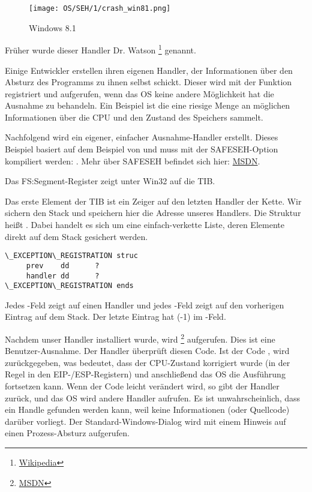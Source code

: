 \begin{figure}[H]
\centering
\texttt{[image: OS/SEH/1/crash\_win81.png]}
\caption{Windows 8.1}
\end{figure}

Früher wurde dieser Handler Dr. Watson
\footnote{\href{http://go.yurichev.com/17046}{Wikipedia}}
genannt.

Einige Entwickler erstellen ihren eigenen Handler, der Informationen über den Absturz
des Programms zu ihnen selbst schickt.
Dieser wird mit der Funktion  registriert und aufgerufen,
wenn das \ac{OS} keine andere Möglichkeit hat die Ausnahme zu behandeln.
\myindex{\oracle}
Ein Beispiel ist \oracle die eine riesige Menge an möglichen Informationen über die \ac{CPU}
und den Zustand des Speichers sammelt.

Nachfolgend wird ein eigener, einfacher Ausnahme-Handler erstellt.
Dieses Beispiel basiert auf dem Beispiel von \PietrekSEH und muss mit der SAFESEH-Option
kompiliert werden: .
Mehr über SAFESEH befindet sich hier: \href{http://go.yurichev.com/17252}{MSDN}.



Das FS:Segment-Register zeigt unter Win32 auf die \ac{TIB}.

Das erste Element der \ac{TIB} ist ein Zeiger auf den letzten Handler der Kette.
Wir sichern den Stack und speichern hier die Adresse unseres Handlers.
Die Struktur heißt . Dabei handelt es sich um eine
einfach-verkette Liste, deren Elemente direkt auf dem Stack gesichert werden.

\begin{lstlisting}[caption=MSVC/VC/crt/src/exsup.inc,style=customasmx86]
\_EXCEPTION\_REGISTRATION struc
     prev    dd      ?
     handler dd      ?
\_EXCEPTION\_REGISTRATION ends
\end{lstlisting}

Jedes -Feld zeigt auf einen Handler und jedes -Feld zeigt auf den
vorherigen Eintrag auf dem Stack.
Der letzte Eintrag hat  (-1) im -Feld.



Nachdem unser Handler installiert wurde, wird 
\footnote{\href{http://go.yurichev.com/17253}{MSDN}} aufgerufen.
Dies ist eine Benutzer-Ausnahme.
Der Handler überprüft diesen Code.
Ist der Code , wird  zurückgegeben,
was bedeutet, dass der CPU-Zustand korrigiert wurde (in der Regel in den EIP-/ESP-Registern)
und anschließend das \ac{OS} die Ausführung fortsetzen kann.
Wenn der Code leicht verändert wird, so gibt der Handler  zurück,
und das \ac{OS} wird andere Handler aufrufen.
Es ist unwahrscheinlich, dass ein Handle gefunden werden kann, weil keine Informationen
(oder Quellcode) darüber vorliegt.
Der Standard-Windows-Dialog wird mit einem Hinweis auf einen Prozess-Absturz aufgerufen.

